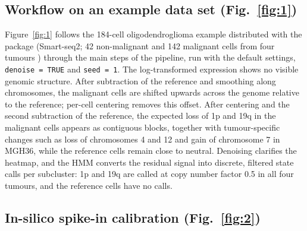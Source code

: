 \subsection{Workflow on an example data set (Fig.~\ref{fig:1})}

Figure~\ref{fig:1} follows the 184-cell oligodendroglioma example distributed with the package (Smart-seq2; 42 non-malignant and 142 malignant cells from four tumours \citep{tirosh2016oligo}) through the main steps of the pipeline, run with the default settings, \texttt{denoise\ =\ TRUE} and \texttt{seed\ =\ 1}. The log-transformed expression shows no visible genomic structure. After subtraction of the reference and smoothing along chromosomes, the malignant cells are shifted upwards across the genome relative to the reference; per-cell centering removes this offset. After centering and the second subtraction of the reference, the expected loss of 1p and 19q in the malignant cells appears as contiguous blocks, together with tumour-specific changes such as loss of chromosomes 4 and 12 and gain of chromosome 7 in MGH36, while the reference cells remain close to neutral. Denoising clarifies the heatmap, and the HMM converts the residual signal into discrete, filtered state calls per subcluster: 1p and 19q are called at copy number factor 0.5 in all four tumours, and the reference cells have no calls.

\subsection{In-silico spike-in calibration (Fig.~\ref{fig:2})}

